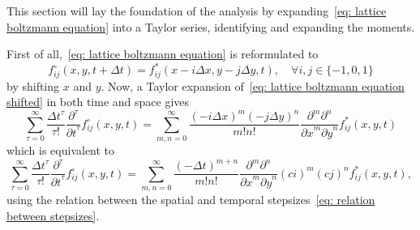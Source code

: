 This section will lay the foundation of the analysis by expanding~\eqref{eq: lattice boltzmann equation} into a Taylor series, identifying and expanding the moments.

First of all,~\eqref{eq: lattice boltzmann equation} is reformulated to
\begin{equation}
  \label{eq: lattice boltzmann equation shifted}
  f_{ij}^{\circ}(x, y, t + \Delta t) = f^*_{ij}(x - i \Delta x , y - j\Delta y, t), \quad\forall i,j\in \{-1, 0, 1\}
\end{equation}
by shifting $x$ and $y$. Now, a Taylor expansion of~\eqref{eq: lattice boltzmann equation shifted} in both time and space gives
\begin{equation*}
  \sum_{\tau = 0}^\infty \frac{{\Delta t}^\tau }{\tau!} \frac{\partial^\tau}{{\partial t}^\tau} f_{ij}^{\circ}(x, y, t) =
  \sum_{m,n = 0}^\infty \frac{{(-i\Delta x)}^m{(-j\Delta y)}^n} {m!n!} \frac{\partial^m \partial^n}{ {\partial x}^m{\partial y}^n} f^*_{ij}(x, y, t)
\end{equation*}
which is equivalent to
\begin{equation}
  \label{eq: Taylor LB1}
  \sum_{\tau = 0}^\infty \frac{{\Delta t}^\tau }{\tau!} \frac{\partial^\tau}{{\partial t}^\tau} f_{ij}^{\circ}(x, y, t) =
    \sum_{m,n = 0}^\infty \frac{{(-\Delta t)}^{m+n}} {m!n!} \frac{\partial^m \partial^n}{ {\partial x}^m{\partial y}^n} {(ci)}^m {(cj)}^n f^*_{ij}(x, y, t),
\end{equation}
using the relation between the spatial and temporal stepsizes~\eqref{eq: relation between stepsizes}.

